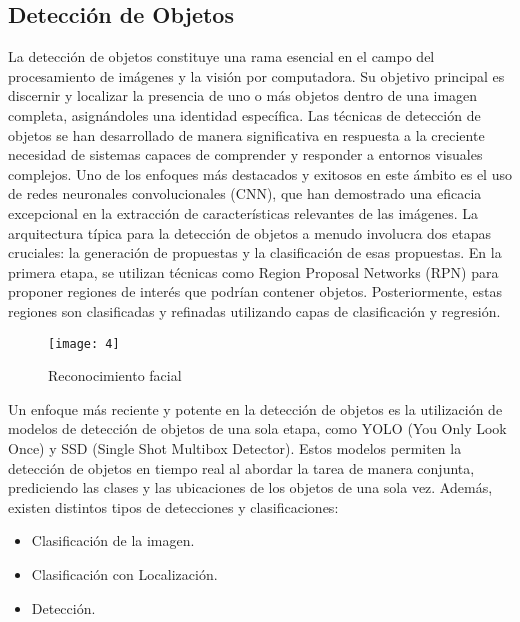	\subsection{Detección de Objetos}
	La detección de objetos constituye una rama esencial en el campo del procesamiento de imágenes y la visión por computadora. Su objetivo principal es discernir y localizar la presencia de uno o más objetos dentro de una imagen completa, asignándoles una identidad específica.
Las técnicas de detección de objetos se han desarrollado de manera significativa en respuesta a la creciente necesidad de sistemas capaces de comprender y responder a entornos visuales complejos. Uno de los enfoques más destacados y exitosos en este ámbito es el uso de redes neuronales convolucionales (CNN), que han demostrado una eficacia excepcional en la extracción de características relevantes de las imágenes.
La arquitectura típica para la detección de objetos a menudo involucra dos etapas cruciales: la generación de propuestas y la clasificación de esas propuestas. En la primera etapa, se utilizan técnicas como Region Proposal Networks (RPN) para proponer regiones de interés que podrían contener objetos. Posteriormente, estas regiones son clasificadas y refinadas utilizando capas de clasificación y regresión.

	\begin{figure}[ht]
	    \centering
		\texttt{[image: 4]}
		\caption{Reconocimiento facial}
	\end{figure}		
	
	Un enfoque más reciente y potente en la detección de objetos es la utilización de modelos de detección de objetos de una sola etapa, como YOLO (You Only Look Once) y SSD (Single Shot Multibox Detector). Estos modelos permiten la detección de objetos en tiempo real al abordar la tarea de manera conjunta, prediciendo las clases y las ubicaciones de los objetos de una sola vez.
Además, existen distintos tipos de detecciones y clasificaciones:
	\begin{itemize}
		\item Clasificación de la imagen.
		\item Clasificación con Localización.
		\item Detección.
	\end{itemize}

